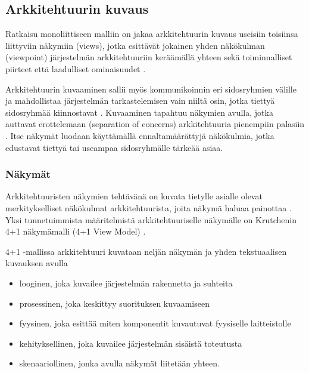 \documentclass[finnish]{tktltiki2}
\theoremstyle{definition}
\theoremstyle{remark}
\begin{document}
\subsection{Arkkitehtuurin kuvaus}

Ratkaisu monoliittiseen malliin on jakaa arkkitehtuurin kuvaus useisiin toisiinsa liittyviin näkymiin (views), jotka esittävät jokainen yhden näkökulman (viewpoint) järjestelmän arkkitehtuuriin keräämällä yhteen sekä toiminnalliset piirteet että laadulliset ominaisuudet \citetext{\citealp[s. 33-34]{Rozanski:2011:SSA:2072649}; \citealp[s. 8-9]{gorton_understanding_2011}; \citealp[s. 117]{Ran:1998:ASV:288408.288438}}.

Arkkitehtuurin kuvaaminen sallii myös kommunikoinnin eri sidosryhmien välille ja mahdollistaa järjestelmän tarkastelemisen vain niiltä osin, jotka tiettyä sidosryhmää kiinnostavat \citetext{\citealp[s. 329]{ARaHVeSCiSDu}; \citealp[s. 60]{Brondum:2010:TAV:1833335.1833344}}. Kuvaaminen tapahtuu näkymien avulla, jotka auttavat erottelemaan (separation of concerns) arkkitehtuuria pienempiin palasiin \citep[s. 2]{Galster:2011:DTC:2031759.2031761}. Itse näkymät luodaan käyttämällä ennaltamäärättyjä näkökulmia, jotka edustavat tiettyä tai useampaa sidosryhmälle tärkeää asiaa. 


\subsubsection{Näkymät}
Arkkitehtuuristen näkymien tehtävänä on kuvata tietylle asialle olevat merkitykselliset näkökulmat arkkitehtuurista, joita näkymä haluaa painottaa \citetext{\citealp[s. 34]{Rozanski:2011:SSA:2072649}; \citealp[s. 15]{may2005survey}}. Yksi tunnetuimmista määritelmistä arkkitehtuuriselle näkymälle on Krutchenin 4+1 näkymämalli (4+1 View Model) \citep[s.7-8]{gorton_understanding_2011}. 

4+1 -mallissa arkkitehtuuri kuvataan neljän näkymän ja yhden tekstuaalisen kuvauksen avulla 

\begin{itemize}
	\item looginen, joka kuvailee järjestelmän rakennetta ja suhteita
	\item prosessinen, joka keskittyy suorituksen kuvaamiseen
	\item fyysinen, joka esittää miten komponentit kuvautuvat fyysiselle laitteistolle
	\item kehityksellinen, joka kuvailee järjestelmän sisäistä toteutusta
	\item skenaariollinen, jonka avulla näkymät liitetään yhteen.
\end{itemize}
\end{document}
